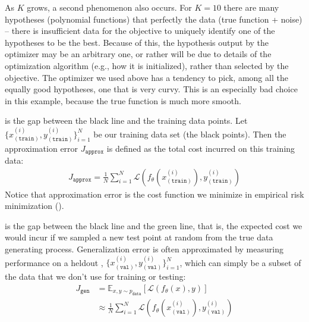 As $K$ grows, a second phenomenon also occurs. For $K=10$ there are many hypotheses (polynomial functions) that perfectly the data (true function + noise) -- there is insufficient data for the objective to uniquely identify one of the hypotheses to be the best. Because of this, the hypothesis output by the optimizer may be an arbitrary one, or rather will be due to details of the optimization algorithm (e.g., how it is initialized), rather than selected by the objective. The optimizer we used above has a tendency to pick, among all the equally good hypotheses, one that is very curvy. This is an especially bad choice in this example, because the true function is much more smooth.


 is the gap between the black line and the training data points. Let $\{x_{(\texttt{train})}^{(i)}, y_{(\texttt{train})}^{(i)}\}_{i=1}^N$ be our training data set (the black points). Then the approximation error $J_{\texttt{approx}}$ is defined as the total cost incurred on this training data:
\begin{align}
    J_{\texttt{approx}} = \frac{1}{N} \sum_{i=1}^N \mathcal{L}(f_{\theta}(x_{(\texttt{train})}^{(i)}), y_{(\texttt{train})}^{(i)})
\end{align}
Notice that approximation error is the cost function we minimize in empirical risk minimization (\chap{\ref{chapter:intro_to_learning}}).

 is the gap between the black line and the green line, that is, the expected cost we would incur if we sampled a new test point at random from the true data generating process. Generalization error is often approximated by measuring performance on a heldout , $\{x_{(\texttt{val})}^{(i)}, y_{(\texttt{val})}^{(i)}\}_{i=1}^N$, which can simply be a subset of the data that we don't use for training or testing:
\begin{align}
    J_{\texttt{gen}} &= \mathbb{E}_{x,y \sim p_{\texttt{data}}} [ \mathcal{L}(f_{\theta}(x), y)]\\
                        &\approx \frac{1}{N} \sum_{i=1}^N \mathcal{L}(f_{\theta}(x_{(\texttt{val})}^{(i)}), y_{(\texttt{val})}^{(i)})
\end{align}

